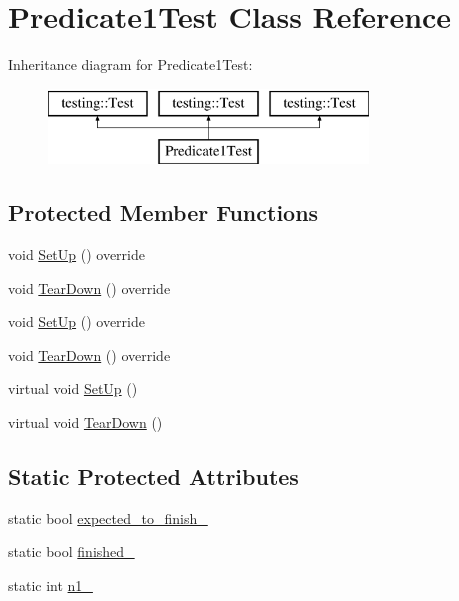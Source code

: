 \hypertarget{class_predicate1_test}{}\section{Predicate1\+Test Class Reference}
\label{class_predicate1_test}
Inheritance diagram for Predicate1\+Test\+:\begin{figure}[H]
\begin{center}
\leavevmode
\includegraphics[height=2.000000cm]{d7/d5e/class_predicate1_test}
\end{center}
\end{figure}
\subsection*{Protected Member Functions}
\begin{DoxyCompactItemize}
\item 
void \mbox{\hyperlink{class_predicate1_test_a26ffe626e992d5983e6a48c965b0a0a9}{Set\+Up}} () override
\item 
void \mbox{\hyperlink{class_predicate1_test_aacedc6281afabd551ae2e67777016f3d}{Tear\+Down}} () override
\item 
void \mbox{\hyperlink{class_predicate1_test_a26ffe626e992d5983e6a48c965b0a0a9}{Set\+Up}} () override
\item 
void \mbox{\hyperlink{class_predicate1_test_aacedc6281afabd551ae2e67777016f3d}{Tear\+Down}} () override
\item 
virtual void \mbox{\hyperlink{class_predicate1_test_a481704a09f73a37158513f9a336dbdd9}{Set\+Up}} ()
\item 
virtual void \mbox{\hyperlink{class_predicate1_test_ad2974af5c6abc508847c3a9912b24a90}{Tear\+Down}} ()
\end{DoxyCompactItemize}
\subsection*{Static Protected Attributes}
\begin{DoxyCompactItemize}
\item 
static bool \mbox{\hyperlink{class_predicate1_test_ad91cfa58e6352d53abacce32df2ef635}{expected\+\_\+to\+\_\+finish\+\_\+}}
\item 
static bool \mbox{\hyperlink{class_predicate1_test_a6d45fb2d1f01a5c8baf28f60039c244e}{finished\+\_\+}}
\item 
static int \mbox{\hyperlink{class_predicate1_test_a528d9f7f618b17802962a3824eea11e3}{n1\+\_\+}}
\end{DoxyCompactItemize}
